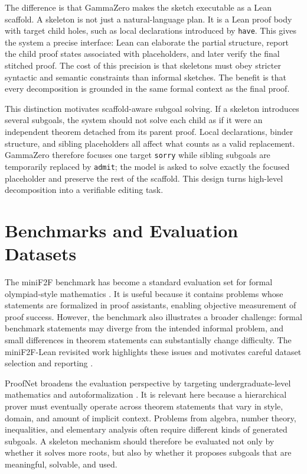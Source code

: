 \documentclass[en]{uet_awesome_thesis/uet-awesome-thesis}
\begin{document}
The difference is that GammaZero makes the sketch executable as a Lean scaffold. A skeleton is not just
a natural-language plan. It is a Lean proof body with target child holes, such as local declarations
introduced by \texttt{have}. This gives the system a precise interface: Lean can elaborate the partial
structure, report the child proof states associated with placeholders, and later verify the final stitched
proof. The cost of this precision is that skeletons must obey stricter syntactic and semantic constraints
than informal sketches. The benefit is that every decomposition is grounded in the same formal context
as the final proof.

This distinction motivates scaffold-aware subgoal solving. If a skeleton introduces several subgoals,
the system should not solve each child as if it were an independent theorem detached from its parent
proof. Local declarations, binder structure, and sibling placeholders all affect what counts as a valid
replacement. GammaZero therefore focuses one target \texttt{sorry} while sibling subgoals are temporarily
replaced by \texttt{admit}; the model is asked to solve exactly the focused placeholder and preserve the rest of the
scaffold. This design turns high-level decomposition into a verifiable editing task.

\section{Benchmarks and Evaluation Datasets}

The miniF2F benchmark has become a standard evaluation set for formal olympiad-style mathematics
\citep{zheng2021minif2f}. It is useful because it contains problems whose statements are formalized in
proof assistants, enabling objective measurement of proof success. However, the benchmark also
illustrates a broader challenge: formal benchmark statements may diverge from the intended informal
problem, and small differences in theorem statements can substantially change difficulty. The
miniF2F-Lean revisited work highlights these issues and motivates careful dataset selection and reporting
\citep{ospanov2025minif2fLeanRevisited}.

ProofNet broadens the evaluation perspective by targeting undergraduate-level mathematics and
autoformalization \citep{azerbayev2023proofnet}. It is relevant here because a hierarchical prover must
eventually operate across theorem statements that vary in style, domain, and amount of implicit context.
Problems from algebra, number theory, inequalities, and elementary analysis often require different kinds
of generated subgoals. A skeleton mechanism should therefore be evaluated not only by whether it solves
more roots, but also by whether it proposes subgoals that are meaningful, solvable, and used.
\end{document}
